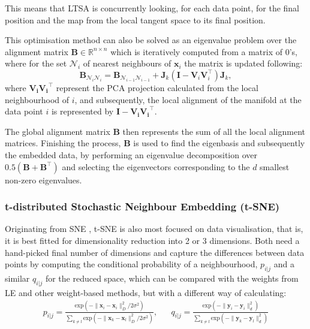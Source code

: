         This means that LTSA is concurrently looking, for each data point, for the final position and the map from the local tangent space to its final position.
        
        This optimisation method can also be solved as an eigenvalue problem over the alignment matrix $\bm{B}\in\mathbb{R}^{n\times n}$ which is iteratively computed from a matrix of 0's, where for the set $\mathcal{N}_i$ of nearest neighbours of $\bm{x}_i$ the matrix is updated following:
        \begin{equation}
            \bm{B}_{\mathcal{N}_i\mathcal{N}_i} = \bm{B}_{\mathcal{N}_{i-1}\mathcal{N}_{i-1}} + \bm{J}_k(\bm{I} - \bm{V}_i\bm{V}_i^\top)\bm{J}_k,
        \end{equation}
        where $\bm{V_iV_i}^\top$ represent the PCA projection calculated from the local neighbourhood of $i$, and subsequently, the local alignment of the manifold at the data point $i$ is represented by $\bm{I - V_iV_i}^\top$.
        
        The global alignment matrix $\bm{B}$ then represents the sum of all the local alignment matrices. Finishing the process, $\bm{B}$ is used to find the eigenbasis and subsequently the embedded data, by performing an eigenvalue decomposition over $0.5(\bm{B} + \bm{B}^\top)$ and selecting the eigenvectors corresponding to the $d$ smallest non-zero eigenvalues. \\        
    
    \subsubsection{t-distributed Stochastic Neighbour Embedding (t-SNE)}
        Originating from SNE \cite{sne}, t-SNE \cite{t-sne} is also most focused on data visualisation, that is, it is best fitted for dimensionality reduction into 2 or 3 dimensions. Both need a hand-picked final number of dimensions and capture the differences between data points by computing the conditional probability of a neighbourhood, $p_{i|j}$ and a similar $q_{i|j}$ for the reduced space, which can be compared with the weights from LE and other weight-based methods, but with a different way of calculating:
        \begin{align}
            p_{i|j} = \frac{\text{exp}(-\|\bm{x}_i-\bm{x}_i\|_D^2/2\sigma^2)}{\sum_{k\neq l}\text{exp}\left(-\| \bm{x}_k - \bm{x}_l \|_D^2/2\sigma^2 \right)}, &&
            q_{i|j} = \frac{\text{exp}(-\|\bm{y}_i-\bm{y}_i\|_d^2)}{\sum_{k\neq l}\text{exp}\left(-\| \bm{y}_k - \bm{y}_l \|_d^2 \right)}
        \end{align}
        
